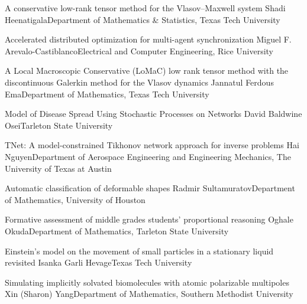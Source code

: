 \begin{postersPG}
\item\poster %
{A conservative low-rank tensor method for the Vlasov–Maxwell system}
{Shadi Heenatigala}{Department of Mathematics \& Statistics, Texas Tech University}

\item\poster %
{Accelerated distributed optimization for multi-agent synchronization}
{Miguel F. Arevalo-Castiblanco}{Electrical and Computer Engineering, Rice University}

\item\poster %
{A Local Macroscopic Conservative (LoMaC) low rank tensor method with the discontinuous Galerkin method for the Vlasov dynamics}
{Jannatul Ferdous Ema}{Department of Mathematics, Texas Tech University}


\item\poster %
{Model of Disease Spread Using Stochastic Processes on Networks}
{David Baldwine Osei}{Tarleton State University}

\item\poster %
{TNet: A model-constrained Tikhonov network approach for inverse problems}
{Hai Nguyen}{Department of Aerospace Engineering and Engineering Mechanics, The University of Texas at Austin}

\item\poster %
{Automatic classification of deformable shapes}
{Radmir Sultamuratov}{Department of Mathematics, University of Houston}

\item\poster %
{Formative assessment of middle grades students' proportional reasoning}
{Oghale Okuda}{Department of Mathematics, Tarleton State University}

\item\poster %
{Einstein's model on the movement of small particles in a stationary liquid revisited}
{Isanka Garli Hevage}{Texas Tech University}

\item\poster %
{Simulating implicitly solvated biomolecules with atomic polarizable multipoles}
{Xin (Sharon) Yang}{Department of Mathematics, Southern Methodist University}


\end{postersPG}
